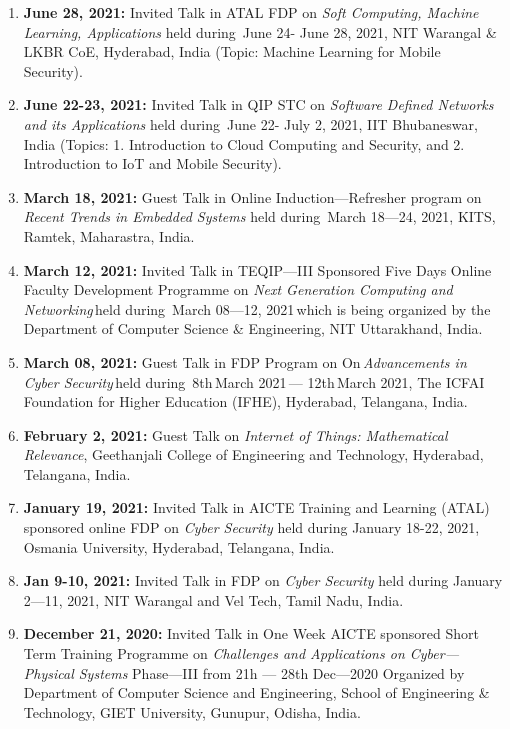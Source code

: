 \begin{enumerate}
\item
\textbf{June 28, 2021:} Invited Talk in ATAL FDP on  \textit{Soft Computing, Machine Learning, Applications} held during  June 24- June 28, 2021, NIT Warangal \& LKBR CoE, Hyderabad, India (Topic: Machine Learning for Mobile Security).

\item
\textbf{June 22-23, 2021:} Invited Talk in QIP STC on \textit{Software Defined Networks and its Applications} held during  June 22- July 2, 2021, IIT Bhubaneswar, India (Topics: 1. Introduction to Cloud Computing and Security, and 2. Introduction to IoT and Mobile Security).

\item
\textbf{March 18, 2021:} Guest Talk in Online Induction—Refresher program on \textit{Recent Trends in Embedded Systems} held during  March 18—24, 2021, KITS, Ramtek, Maharastra, India.

\item
\textbf{March 12, 2021:} Invited Talk in TEQIP—III Sponsored Five Days Online Faculty Development Programme on \textit{Next Generation Computing and Networking} held during  March 08—12, 2021 which is being organized by the Department of Computer Science \& Engineering, NIT Uttarakhand, India.

\item
\textbf{March 08, 2021:} Guest Talk in FDP Program on On \textit{Advancements in Cyber Security} held during  8th March 2021 — 12th March 2021, The ICFAI Foundation for Higher Education (IFHE), Hyderabad, Telangana, India.

\item
\textbf{February 2, 2021:} Guest Talk on \textit{Internet of Things: Mathematical Relevance}, Geethanjali College of Engineering and Technology, Hyderabad, Telangana, India.

\item
\textbf{January 19, 2021:} Invited Talk in AICTE Training and Learning (ATAL) sponsored online FDP on \textit{Cyber Security} held during January 18-22, 2021, Osmania University, Hyderabad, Telangana, India.

\item
\textbf{Jan 9-10, 2021:} Invited Talk in FDP on \textit{Cyber Security} held during January 2—11, 2021, NIT Warangal and Vel Tech, Tamil Nadu, India.

\item
\textbf{December 21, 2020:} Invited Talk in One Week AICTE sponsored Short Term Training Programme on \textit{Challenges and Applications on Cyber—Physical Systems} Phase—III from 21h — 28th Dec—2020 Organized by Department of Computer Science and Engineering, School of Engineering \& Technology, GIET University, Gunupur, Odisha, India.


\end{enumerate}
